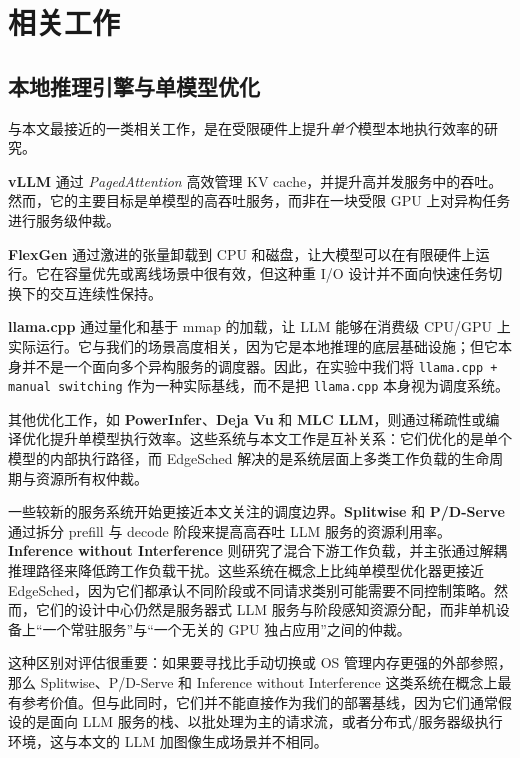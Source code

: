 \section{相关工作}

\subsection{本地推理引擎与单模型优化}

与本文最接近的一类相关工作，是在受限硬件上提升\emph{单个}模型本地执行效率的研究。

\textbf{vLLM}\cite{kwon2023vllm} 通过 \textit{PagedAttention} 高效管理 KV cache，并提升高并发服务中的吞吐。然而，它的主要目标是单模型的高吞吐服务，而非在一块受限 GPU 上对异构任务进行服务级仲裁。

\textbf{FlexGen}\cite{sheng2023flexgen} 通过激进的张量卸载到 CPU 和磁盘，让大模型可以在有限硬件上运行。它在容量优先或离线场景中很有效，但这种重 I/O 设计并不面向快速任务切换下的交互连续性保持。

\textbf{llama.cpp}\cite{llamacpp} 通过量化和基于 mmap 的加载，让 LLM 能够在消费级 CPU/GPU 上实际运行。它与我们的场景高度相关，因为它是本地推理的底层基础设施；但它本身并不是一个面向多个异构服务的调度器。因此，在实验中我们将 \texttt{llama.cpp + manual switching} 作为一种实际基线，而不是把 \texttt{llama.cpp} 本身视为调度系统。

其他优化工作，如 \textbf{PowerInfer}\cite{song2023powerinfer}、\textbf{Deja Vu}\cite{liu2023dejavu} 和 \textbf{MLC LLM}\cite{wu2023mlc}，则通过稀疏性或编译优化提升单模型执行效率。这些系统与本文工作是互补关系：它们优化的是单个模型的内部执行路径，而 EdgeSched 解决的是系统层面上多类工作负载的生命周期与资源所有权仲裁。

一些较新的服务系统开始更接近本文关注的调度边界。\textbf{Splitwise}\cite{patel2024splitwise} 和 \textbf{P/D-Serve}\cite{jin2024pdserve} 通过拆分 prefill 与 decode 阶段来提高高吞吐 LLM 服务的资源利用率。\textbf{Inference without Interference}\cite{hu2024interference} 则研究了混合下游工作负载，并主张通过解耦推理路径来降低跨工作负载干扰。这些系统在概念上比纯单模型优化器更接近 EdgeSched，因为它们都承认不同阶段或不同请求类别可能需要不同控制策略。然而，它们的设计中心仍然是服务器式 LLM 服务与阶段感知资源分配，而非单机设备上“一个常驻服务”与“一个无关的 GPU 独占应用”之间的仲裁。

这种区别对评估很重要：如果要寻找比手动切换或 OS 管理内存更强的外部参照，那么 Splitwise、P/D-Serve 和 Inference without Interference 这类系统在概念上最有参考价值。但与此同时，它们并不能直接作为我们的部署基线，因为它们通常假设的是面向 LLM 服务的栈、以批处理为主的请求流，或者分布式/服务器级执行环境，这与本文的 LLM 加图像生成场景并不相同。

